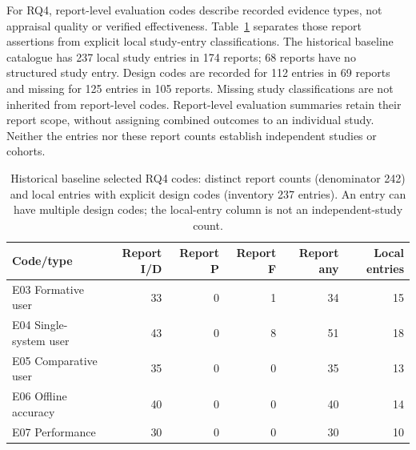 \documentclass[manuscript,review,screen]{acmart}
\begin{document}
For RQ4, report-level evaluation codes describe recorded evidence types, not appraisal quality or verified effectiveness. Table~\ref{tab:retrospective-evaluation-scope} separates those report assertions from explicit local study-entry classifications. The historical baseline catalogue has 237 local study entries in 174 reports; 68 reports have no structured study entry. Design codes are recorded for 112 entries in 69 reports and missing for 125 entries in 105 reports. Missing study classifications are not inherited from report-level codes. Report-level evaluation summaries retain their report scope, without assigning combined outcomes to an individual study. Neither the entries nor these report counts establish independent studies or cohorts.

\begin{table}[htbp]

\centering\small

\caption{Historical baseline selected RQ4 codes: distinct report counts (denominator 242) and local entries with explicit design codes (inventory 237 entries). An entry can have multiple design codes; the local-entry column is not an independent-study count.}

\label{tab:retrospective-evaluation-scope}

\begin{tabular}{@{}lrrrrr@{}}

\toprule Code/type & Report I/D & Report P & Report F & Report any & Local entries\\\midrule

E03 Formative user & 33 & 0 & 1 & 34 & 15\\

E04 Single-system user & 43 & 0 & 8 & 51 & 18\\

E05 Comparative user & 35 & 0 & 0 & 35 & 13\\

E06 Offline accuracy & 40 & 0 & 0 & 40 & 14\\

E07 Performance & 30 & 0 & 0 & 30 & 10\\

\bottomrule\end{tabular}

\end{table}
\end{document}
